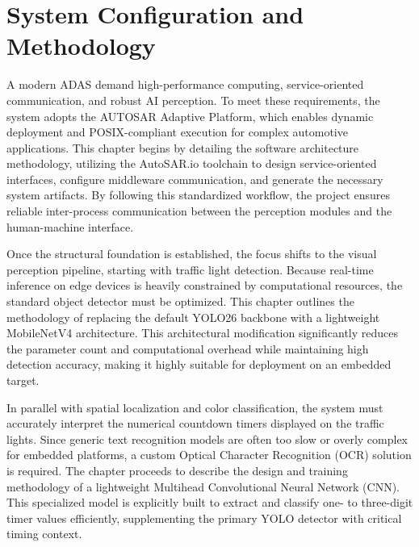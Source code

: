 
\chapter{System Configuration and Methodology}

A modern ADAS demand high-performance computing, service-oriented communication, and robust AI perception. To meet these requirements, the system adopts the AUTOSAR Adaptive Platform, which enables dynamic deployment and POSIX-compliant execution for complex automotive applications. This chapter begins by detailing the software architecture methodology, utilizing the AutoSAR.io toolchain to design service-oriented interfaces, configure middleware communication, and generate the necessary system artifacts. By following this standardized workflow, the project ensures reliable inter-process communication between the perception modules and the human-machine interface.

Once the structural foundation is established, the focus shifts to the visual perception pipeline, starting with traffic light detection. Because real-time inference on edge devices is heavily constrained by computational resources, the standard object detector must be optimized. This chapter outlines the methodology of replacing the default YOLO26 backbone with a lightweight MobileNetV4 architecture. This architectural modification significantly reduces the parameter count and computational overhead while maintaining high detection accuracy, making it highly suitable for deployment on an embedded target.

In parallel with spatial localization and color classification, the system must accurately interpret the numerical countdown timers displayed on the traffic lights. Since generic text recognition models are often too slow or overly complex for embedded platforms, a custom Optical Character Recognition (OCR) solution is required. The chapter proceeds to describe the design and training methodology of a lightweight Multihead Convolutional Neural Network (CNN). This specialized model is explicitly built to extract and classify one- to three-digit timer values efficiently, supplementing the primary YOLO detector with critical timing context.

